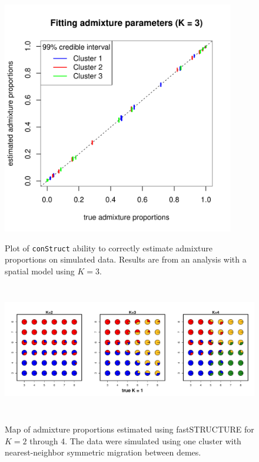 \documentclass[12pt]{article}
\begin{document}
\begin{figure}
	\centering
		{\includegraphics[width=4in,height=4in]{figs/sims/simK3_adprop_fit.pdf}}
		\caption{
			Plot of \texttt{conStruct} ability to correctly estimate admixture proportions on simulated data.
			Results are from an analysis with a spatial model using $K=3$.
		}\label{simK3_adprop_fit}
\end{figure}

\begin{figure}
	\centering
		{\includegraphics[width=6in,height=2.25in]{figs/fastStr/fastStr_simK1_pies.pdf}}
	\caption{
	Map of admixture proportions estimated using fastSTRUCTURE \citep{fastStructure} for $K=2$ through 4.
	The data were simulated using one cluster with nearest-neighbor symmetric migration between demes.
    }\label{fastStr_simK1}
\end{figure}
\end{document}
